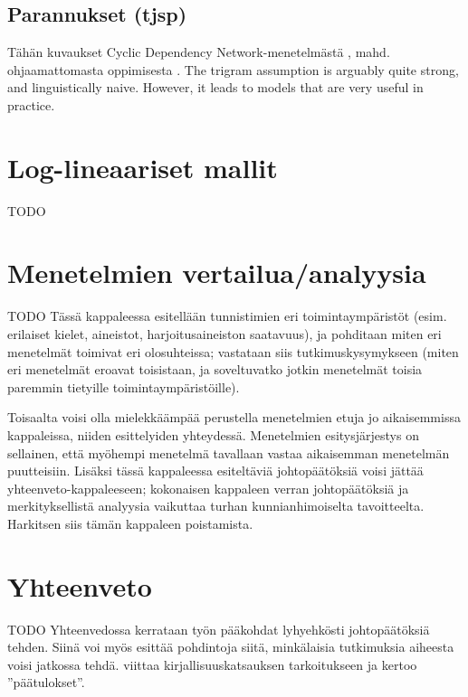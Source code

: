 \documentclass[utf8,bachelor,manualbib]{gradu3}
\begin{document}
\section{Parannukset (tjsp)}

Tähän kuvaukset Cyclic Dependency Network-menetelmästä \citep{toutanova2003}, mahd. ohjaamattomasta oppimisesta \citep{banko2004}. The trigram assumption is arguably quite strong, and linguistically naive. However, it leads to models that are very useful in
practice.


\chapter{Log-lineaariset mallit}

TODO



\chapter{Menetelmien vertailua/analyysia}


TODO Tässä kappaleessa esitellään tunnistimien eri toimintaympäristöt (esim. erilaiset kielet, aineistot, harjoitusaineiston saatavuus), ja pohditaan miten eri menetelmät toimivat eri olosuhteissa; vastataan siis tutkimuskysymykseen (miten eri menetelmät eroavat toisistaan, ja soveltuvatko jotkin menetelmät toisia paremmin tietyille toimintaympäristöille).

Toisaalta voisi olla mielekkäämpää perustella menetelmien etuja jo aikaisemmissa kappaleissa, niiden esittelyiden yhteydessä. Menetelmien esitysjärjestys on sellainen, että myöhempi menetelmä tavallaan vastaa aikaisemman menetelmän puutteisiin.  Lisäksi tässä kappaleessa esiteltäviä johtopäätöksiä voisi jättää yhteenveto-kappaleeseen; kokonaisen kappaleen verran johtopäätöksiä ja merkityksellistä analyysia vaikuttaa turhan kunnianhimoiselta tavoitteelta.  Harkitsen siis tämän kappaleen poistamista.


\chapter{Yhteenveto}

TODO Yhteenvedossa kerrataan työn pääkohdat lyhyehkösti johtopäätöksiä tehden. Siinä voi myös esittää pohdintoja siitä, minkälaisia tutkimuksia aiheesta voisi jatkossa tehdä. viittaa kirjallisuuskatsauksen tarkoitukseen ja kertoo ''päätulokset''.
\end{document}
